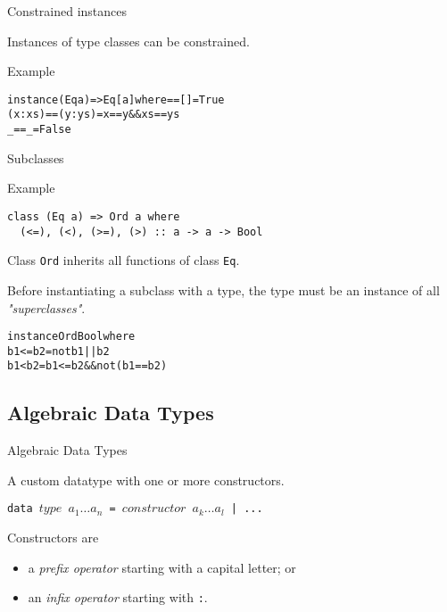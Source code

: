 \documentclass{beamer}
\def\code#1{\texttt{\frenchspacing#1}}
\begin{document}
\begin{frame}[fragile]{Constrained instances}

Instances of type classes can be constrained.

\pause

\begin{exampleblock}{Example}
\begin{alltt}
instance (Eq a) => Eq [a] where\pause
  [] == [] = True\pause
  (x:xs) == (y:ys) = x == y && xs == ys\pause
  _ == _ = False
\end{alltt}
\end{exampleblock}

\end{frame}

\begin{frame}[fragile]{Subclasses}

\begin{exampleblock}{Example}
\begin{verbatim}
class (Eq a) => Ord a where
  (<=), (<), (>=), (>) :: a -> a -> Bool
\end{verbatim}

Class \code{Ord} inherits all functions of class \code{Eq}.
\end{exampleblock}

\pause

\vspace{1cm}
Before instantiating a subclass with a type, the type must be an instance of all \textit{"superclasses"}.

\pause

\begin{alltt}
instance Ord Bool where
  b1 <= b2 = not b1 || b2
  b1 < b2 = b1 <= b2 && not(b1 == b2)
\end{alltt}

\end{frame}

\subsection{Algebraic Data Types}

\begin{frame}{Algebraic Data Types}

A custom datatype with one or more constructors.

\pause

\begin{block}{\centering \code{data $type$ $a_1 \dots a_n$ = $constructor$ $a_k \dots a_l$ | ...}}
\end{block}

\pause

\vspace{1cm}
Constructors are
\begin{itemize}
    \item a \textit{prefix operator} starting with a capital letter; or
    \item an \textit{infix operator} starting with \code{:}.
\end{itemize}

\end{frame}
\end{document}
